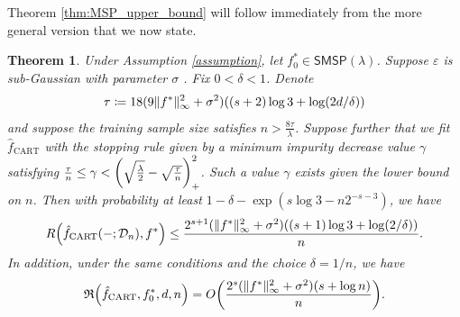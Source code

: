 \documentclass[11pt]{article}
\newtheorem{theorem}{Theorem}[section]
\DeclarePairedDelimiter{\paren}{(}{)}
\DeclarePairedDelimiter{\norm}{\|}{\|}
\newcommand{\sparsity}{s}
\newcommand{\nfeats}{d}
\newcommand{\nsamples}{n}
\newcommand{\data}[1][n]{\mathcal{D}_{#1}}
\newcommand{\MSP}{\textsf{MSP}}
\newcommand{\fcart}{\hat{f}_{\operatorname{CART}}}
\newcommand{\stabmsp}{\textsf{SMSP}}
\newcommand{\objective}{\mathfrak{R}}
\begin{document}
Theorem \ref{thm:MSP_upper_bound} will follow immediately from the more general version that we now state.

\begin{theorem}
    \label{thm:MSP_upper_bound_appendix}
    Under Assumption \ref{assumption}, let $f_0^* \in \stabmsp(\lambda)$.
    Suppose $\varepsilon$ is sub-Gaussian with parameter $\sigma$ \citep{wainwright2019high}.
    Fix $0 < \delta < 1$.
    Denote 
    \begin{equation}
        \tau \coloneqq 18(9\norm{f^*}_\infty^2 + \sigma^2)\paren*{(s+2)\log 3 + \log(2\nfeats/\delta)}
    \end{equation}
    and suppose the training sample size satisfies $n > \frac{8\tau}{\lambda}$.
    Suppose further that we fit $\fcart$ with the stopping rule given by a minimum impurity decrease value $\gamma$ satisfying $\frac{\tau}{n} \leq \gamma < \paren*{\sqrt{\frac{\lambda}{2}} - \sqrt{\frac{\tau}{n}}}_+^2$.
    Such a value $\gamma$ exists given the lower bound on $\nsamples$.
    Then with probability at least $1-\delta-\exp(s\log 3 - n2^{-s-3})$, we have
    \begin{equation}
        \label{eq:msp_upper_probability}
        R\paren*{\fcart(-;\data),f^*} \leq \frac{2^{\sparsity+1}(\norm{f^*}_\infty^2 + \sigma^2)\paren*{(s+1)\log 3 +\log(2/\delta)}}{n}.
    \end{equation}
    In addition, under the same conditions and the choice $\delta = 1/n$, we have
    \begin{equation}
        \label{eq:msp_upper_expectation_appendix}
        \objective\paren*{\fcart, f^*_0,\nfeats,\nsamples} = O\paren*{\frac{2^{\sparsity}(\norm{f^*}_\infty^2 + \sigma^2)(\sparsity + \log \nsamples)}{n}}.
    \end{equation}
\end{theorem}
\end{document}
